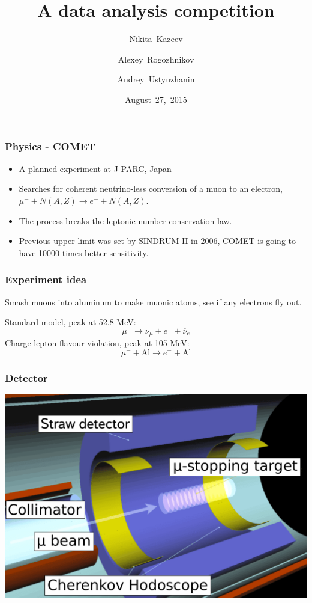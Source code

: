 \documentclass[luatex,mathserif,serif,utf8,table]{beamer}
\title{A data analysis competition}
\date{August~27,~2015}
\author{\underline{Nikita~Kazeev}\and Alexey~Rogozhnikov\and Andrey~Ustyuzhanin}
\institute{The Yandex School of Data Analysis}
\begin{document}
\frame{\titlepage}
\begin{frame}
  \frametitle{Physics - COMET}
  \begin{itemize}
  \item A planned experiment at J-PARC, Japan
  \item Searches for coherent neutrino-less conversion of a muon to an
    electron, $\mu^- + N(A,Z) \rightarrow e^- + N(A,Z)$.
  \item The process breaks the leptonic number conservation law.
  \item Previous upper limit was set by SINDRUM II in 2006, COMET is
    going to have 10000 times better sensitivity.
  \end{itemize}
\end{frame}

\begin{frame}
  \frametitle{Experiment idea} Smash muons into aluminum to make
  muonic atoms, see if any electrons fly out. 
  \newline \par Standard model, peak at 52.8 MeV:
  \begin{equation}
    \mu^{-} \rightarrow \nu_\mu + e^{-} + \overline{\nu}_e
  \end{equation}
  Charge lepton flavour violation, peak at 105 MeV:
  \begin{equation}
    \mu^{-}+\text{Al} \rightarrow e^{-} + \text{Al}
  \end{equation}
\end{frame}

\begin{frame}
  \frametitle{Detector}
  \includegraphics[width=\textwidth]{comet_3d_labels_imposed.pdf}
\end{frame}
\end{document}
